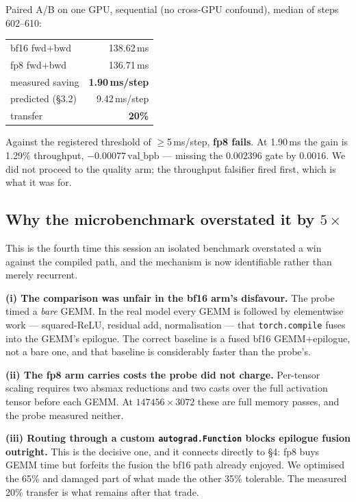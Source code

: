 \documentclass{article}
\newcommand{\vb}{\mathrm{val\_bpb}}
\begin{document}
Paired A/B on one GPU, sequential (no cross-GPU confound), median of steps 602--610:
\begin{center}\begin{small}
\begin{tabular}{lr}
\toprule
bf16 fwd+bwd & 138.62\,ms \\
fp8 fwd+bwd & 136.71\,ms \\
\midrule
measured saving & \textbf{1.90\,ms/step} \\
predicted (\S3.2) & 9.42\,ms/step \\
transfer & \textbf{20\%} \\
\bottomrule
\end{tabular}
\end{small}\end{center}
Against the registered threshold of $\ge$5\,ms/step, \textbf{fp8 fails}. At 1.90\,ms the gain is 1.29\% throughput, $-0.00077$\,$\vb$ --- missing the $0.002396$ gate by $0.0016$. We did not proceed to the quality arm; the throughput falsifier fired first, which is what it was for.

\subsection{Why the microbenchmark overstated it by $5\times$}
This is the fourth time this session an isolated benchmark overstated a win against the compiled path, and the mechanism is now identifiable rather than merely recurrent.

\textbf{(i) The comparison was unfair in the bf16 arm's disfavour.} The probe timed a \emph{bare} GEMM. In the real model every GEMM is followed by elementwise work --- squared-ReLU, residual add, normalisation --- that \texttt{torch.compile} fuses into the GEMM's epilogue. The correct baseline is a fused bf16 GEMM+epilogue, not a bare one, and that baseline is considerably faster than the probe's.

\textbf{(ii) The fp8 arm carries costs the probe did not charge.} Per-tensor scaling requires two absmax reductions and two casts over the full activation tensor before each GEMM. At $147456\times3072$ these are full memory passes, and the probe measured neither.

\textbf{(iii) Routing through a custom \texttt{autograd.Function} blocks epilogue fusion outright.} This is the decisive one, and it connects directly to \S4: fp8 buys GEMM time but forfeits the fusion the bf16 path already enjoyed. We optimised the 65\% and damaged part of what made the other 35\% tolerable. The measured 20\% transfer is what remains after that trade.
\end{document}
